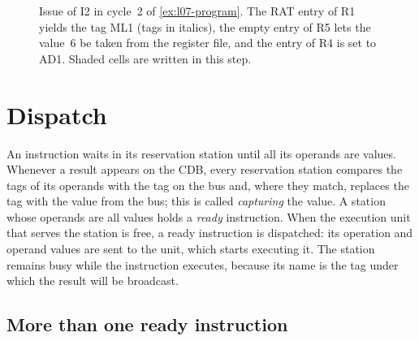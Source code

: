 \documentclass[../main.tex]{subfiles}
\begin{document}
\begin{figure}[htbp]
  \centering
  
  \caption{Issue of I2 in cycle~2 of \cref{ex:l07-program}.  The RAT entry of
    R1 yields the tag ML1 (tags in italics), the empty entry of R5 lets the
    value~6 be taken from the register file, and the entry of R4 is set to
    AD1.  Shaded cells are written in this step.}
  \label{fig:l07-issue}
\end{figure}

\section{Dispatch}
\label{sec:l07-dispatch}

An instruction waits in its reservation station until all its operands are
values.  Whenever a result appears
on the CDB, every reservation station compares the tags of its operands with
the tag on the bus and, where they match, replaces the tag with the value
from the bus; this is called \emph{capturing} the value.  A station whose
operands are all values holds a \emph{ready} instruction.  When the execution
unit that serves the station is free, a ready instruction is dispatched: its
operation and operand values are sent to the unit, which starts executing it.
The station remains busy while the instruction executes, because its name is
the tag under which the result will be broadcast.

\subsection{More than one ready instruction}
\end{document}
